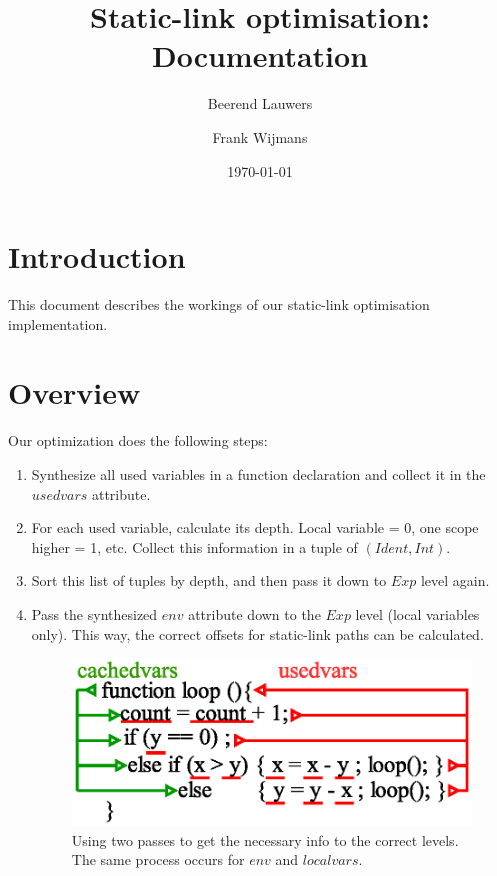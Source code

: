 \documentclass[10pt,a4paper,onecolumn]{article}
\author{Beerend Lauwers \and Frank Wijmans}
\title{Static-link optimisation: Documentation}
\date{\today}
\begin{document}
	\maketitle
	
	\section{Introduction}
    
    This document describes the workings of our static-link optimisation implementation.

	\section {Overview}
    
    Our optimization does the following steps:
    \begin{enumerate}
        \item Synthesize all used variables in a function declaration and collect it in the $ usedvars $ attribute.
        \item For each used variable, calculate its depth. Local variable = 0, one scope higher = 1, etc. Collect this information in a tuple of $(Ident,Int)$.
        \item Sort this list of tuples by depth, and then pass it down to $ Exp $ level again.
        \item Pass the synthesized $ env $ attribute down to the $ Exp $ level (local variables only). This way, the correct offsets for static-link paths can be calculated.
        
        \begin{figure}[htb]
        \centering
        \includegraphics{tofrom.eps}
        \caption{Using two passes to get the necessary info to the correct levels. The same process occurs for $ env $ and $ localvars $.}
        \end{figure}


\end{enumerate}
\end{document}

